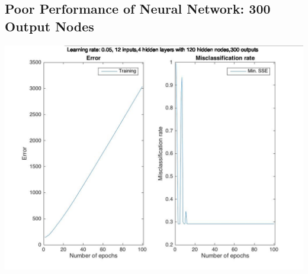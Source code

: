 \documentclass[12pt]{article}
\begin{document}
\subsection{Poor Performance of Neural Network: 300 Output Nodes}
\label{subsec:annPoorPerformance}
\includegraphics[scale=0.45]{images/ann/horribleResultsWIth300Outputs}
\end{document}
